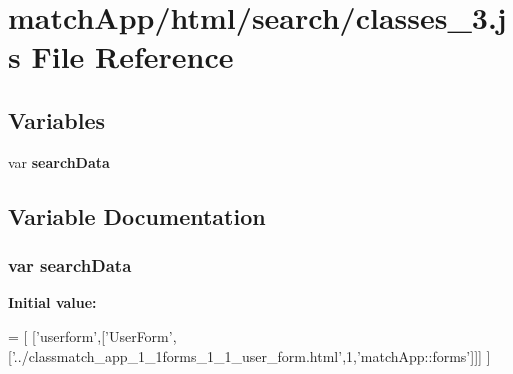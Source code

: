 \section{match\+App/html/search/classes\+\_\+3.js File Reference}
\label{classes__3_8js}
\subsection*{Variables}
\begin{DoxyCompactItemize}
\item 
var {\bf search\+Data}
\end{DoxyCompactItemize}


\subsection{Variable Documentation}
\subsubsection[{search\+Data}]{\setlength{\rightskip}{0pt plus 5cm}var search\+Data}\label{classes__3_8js_ad01a7523f103d6242ef9b0451861231e}
{\bfseries Initial value\+:}
\begin{DoxyCode}
=
[
  [\textcolor{stringliteral}{'userform'},[\textcolor{stringliteral}{'UserForm'},[\textcolor{stringliteral}{'../classmatch\_app\_1\_1forms\_1\_1\_user\_form.html'},1,\textcolor{stringliteral}{'matchApp::forms'}]]]
]
\end{DoxyCode}
